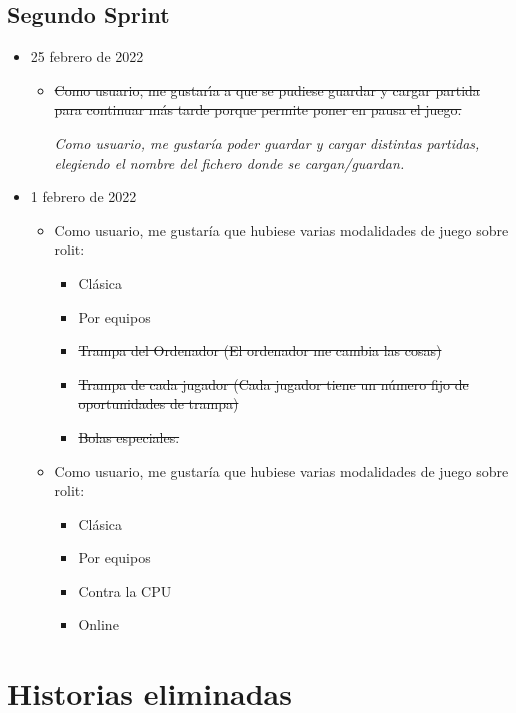 \documentclass{article}
\begin{document}
\subsection{Segundo Sprint}
\begin{itemize}
  \item 25 febrero de 2022
  \begin{itemize}
    \item \st{Como usuario, me gustar\'{\i}a a que se pudiese guardar y cargar partida para continuar m\'as tarde porque permite poner en pausa el juego.}
    
    \textit{Como usuario, me gustaría poder guardar y cargar distintas partidas, elegiendo el nombre del fichero donde se cargan/guardan.}
  \end{itemize}
  \item 1 febrero de 2022
  \begin{itemize}
  	\item Como usuario, me gustaría que hubiese varias modalidades de juego sobre rolit:
		\begin{itemize}
			\item Clásica
			\item Por equipos
			\item \st{Trampa del Ordenador (El ordenador me cambia las cosas)}
			\item \st{Trampa de cada jugador (Cada jugador tiene un n\'umero fijo de oportunidades de trampa)}
			\item \st{Bolas especiales.}
		\end{itemize}
	\item Como usuario, me gustaría que hubiese varias modalidades de juego sobre rolit:
		\begin{itemize}
			\item Clásica
			\item Por equipos
			\item Contra la CPU
			\item Online
		\end{itemize}
  \end{itemize}
\end{itemize}


\section{Historias eliminadas}
\end{document}
